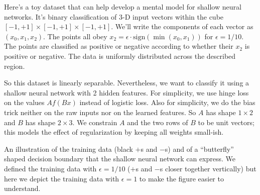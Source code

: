     Here's a toy dataset that can help develop a mental model for shallow
    neural networks.  It's binary classification of $3$-D input vectors within
    the cube $[-1,+1]\times[-1,+1]\times[-1,+1]$.  We'll write the components
    of each vector as $(x_0, x_1, x_2)$.  The points all obey $x_2=\epsilon \cdot
    \text{sign}(\min(x_0, x_1))$ for $\epsilon=1/10$.  The points are classified as positive or negative
    according to whether their $x_2$ is positive or negative.  The data is
    uniformly distributed across the described region.
    \par
    So this dataset is linearly separable.  Nevertheless, we want to classify
    it using a shallow neural network with 2 hidden features.
    For simplicity, we use hinge loss on the values $A f(B x)$ instead of
    logistic loss.  Also for simplicity, we do the bias trick neither on the
    raw inputs nor on the learned features.  So $A$ has shape $1\times 2$ and
    $B$ has shape $2\times 3$.  We constrain $A$ and the two rows of $B$
    to be unit vectors; this models the effect of regularization by keeping all
    weights small-ish.
\begin{marginfigure}[-2cm]
    \centering
{}
    \caption{An illustration of the training data (black $+$s and $-$s)
    and of a ``butterfly'' shaped decision boundary that the shallow
    neural network can express.  We defined the training data with $\epsilon=1/10$
    ($+$s and $-$s closer together vertically)
    but here we depict the training data with $\epsilon=1$ to make the figure
    easier to understand.}
\end{marginfigure}



